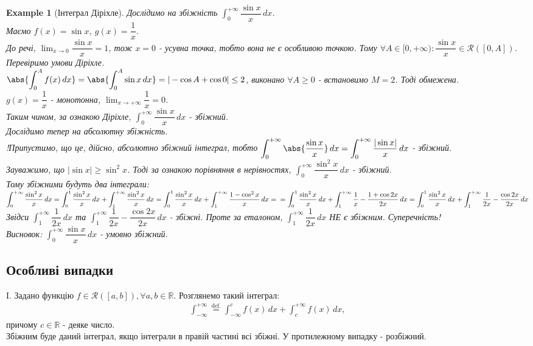 \documentclass[a4paper, 10pt]{article}
\def\huge{\displaystyle}
\def\bigline{\vspace{5mm}\\}
\theoremstyle{theoremdd}
\theoremstyle{theoremdd}
\theoremstyle{theoremdd}
\theoremstyle{theoremdd}
\theoremstyle{theoremdd}
\newtheorem{example}[theorem]{Example}
\theoremstyle{theoremdd}
\theoremstyle{theoremdd}
\theoremstyle{theoremdd}
\theoremstyle{theoremdd}
\begin{document}
\begin{example}[Інтеграл Діріхле]
Дослідимо на збіжність $\huge\int_0^{+\infty} \dfrac{\sin x}{x}\,dx$.\\
Маємо $f(x) = \sin x$, $g(x) = \dfrac{1}{x}$.\\
До речі, $\huge\lim_{x \to 0} \dfrac{\sin x}{x} = 1$, тож $x = 0$ - усувна точка, тобто вона не є особливою точкою. Тому $\forall A \in [0,+\infty): \dfrac{\sin x}{x} \in \mathcal{R}([0,A])$.\\
Перевіримо умови Діріхле.\\
$\abs{\huge\int_0^{A} f(x)\,dx} = \abs{\huge\int_0^A \sin x \,dx} = |-\cos A + \cos 0| \leq 2$, виконано $\forall A \geq 0$ - встановимо $M = 2$. Тоді обмежена.\\
$g(x) = \dfrac{1}{x}$ - монотонна, $\huge\lim_{x \to +\infty} \dfrac{1}{x} = 0$.\\
Таким чином, за ознакою Діріхле,  $\huge\int_0^{+\infty} \dfrac{\sin x}{x}\,dx$  - збіжний.
\bigline
Дослідимо тепер на абсолютну збіжність.\\
!Припустимо, що це, дійсно, абсолютно збіжний інтеграл, тобто
$\huge\int_0^{+\infty} \abs{\dfrac{\sin x}{x}}\,dx = \huge\int_0^{+\infty} \dfrac{|\sin x|}{x}\,dx$ - збіжний.\\Зауважимо, що $|\sin x| \geq \sin^2 x$. Тоді за ознакою порівняння в нерівностях, $\huge\int_0^{+\infty} \dfrac{\sin^2 x}{x}\,dx$ - збіжний.\\
Тому збіжними будуть два інтеграли:\\
$\huge\int_0^{+\infty} \dfrac{\sin^2 x}{x}\,dx = \huge\int_0^1 \dfrac{\sin^2 x}{x}\,dx + \huge\int_1^{+\infty} \dfrac{\sin^2 x}{x}\,dx =
\huge\int_0^1 \dfrac{\sin^2 x}{x}\,dx + \huge\int_1^{+\infty} \dfrac{1 - \cos^2 x}{x}\,dx = \\ = \huge\int_0^1 \dfrac{\sin^2 x}{x}\,dx + \huge\int_1^{+\infty} \dfrac{1}{x} - \dfrac{1+\cos 2x}{2x} \,dx = \huge\int_0^1 \dfrac{\sin^2 x}{x}\,dx + \huge\int_1^{+\infty} \dfrac{1}{2x} - \dfrac{\cos 2x}{2x} \,dx$\\
Звідси $\huge\int_1^{+\infty} \dfrac{1}{2x} \,dx$ та $\huge\int_1^{+\infty} \dfrac{1}{2x}-\dfrac{\cos 2x}{2x} \,dx$ - збіжні. Проте за еталоном, $\huge\int_1^{+\infty} \dfrac{1}{2x} \,dx$ НЕ є збіжним. Суперечність!\\
Висновок: $\huge\int_0^{+\infty} \dfrac{\sin x}{x}\,dx$ - умовно збіжний.
\end{example}

\subsection{Особливі випадки}
I. Задано функцію $f \in \mathcal{R}([a,b]), \forall a,b \in \mathbb{R}$. Розглянемо такий інтеграл:
\begin{align*}
\int_{-\infty}^{+\infty} \overset{\text{def.}}{=} \int_{-\infty}^c f(x)\,dx + \int_c^{+\infty} f(x)\,dx,
\end{align*}
причому $c \in \mathbb{R}$ - деяке число.\\
Збіжним буде даний інтеграл, якщо інтеграли в правій частині всі збіжні. У протилежному випадку - розбіжний.
\end{document}
